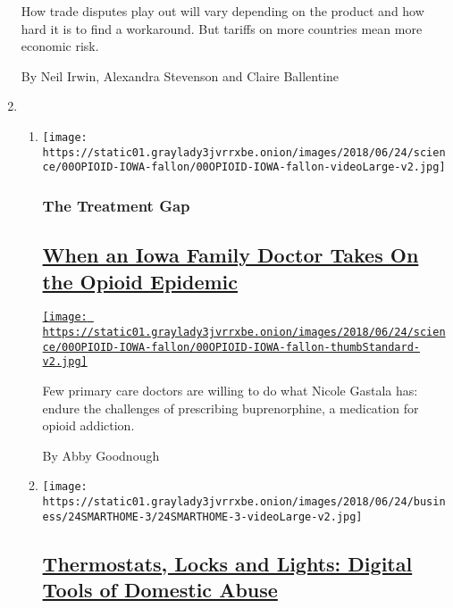 \begin{enumerate}
  How trade disputes play out will vary depending on the product and how
  hard it is to find a workaround. But tariffs on more countries mean
  more economic risk.

  By Neil Irwin, Alexandra Stevenson and Claire Ballentine
\item
  \begin{enumerate}
  \def\labelenumii{\arabic{enumii}.}
  \item
    \texttt{[image: https://static01.graylady3jvrrxbe.onion/images/2018/06/24/science/00OPIOID-IOWA-fallon/00OPIOID-IOWA-fallon-videoLarge-v2.jpg]}

    \hypertarget{the-treatment-gap}{%
    \subsubsection{The Treatment Gap}\label{the-treatment-gap}}

    \hypertarget{when-an-iowa-family-doctor-takes-on-the-opioid-epidemic}{%
    \subsection{\texorpdfstring{\href{/2018/06/23/health/opioid-addiction-suboxone-treatment.html}{When
    an Iowa Family Doctor Takes On the Opioid
    Epidemic}}{When an Iowa Family Doctor Takes On the Opioid Epidemic}}\label{when-an-iowa-family-doctor-takes-on-the-opioid-epidemic}}

    \href{/2018/06/23/health/opioid-addiction-suboxone-treatment.html}{\texttt{[image: https://static01.graylady3jvrrxbe.onion/images/2018/06/24/science/00OPIOID-IOWA-fallon/00OPIOID-IOWA-fallon-thumbStandard-v2.jpg]}}

    Few primary care doctors are willing to do what Nicole Gastala has:
    endure the challenges of prescribing buprenorphine, a medication for
    opioid addiction.

    By Abby Goodnough
  \item
    \texttt{[image: https://static01.graylady3jvrrxbe.onion/images/2018/06/24/business/24SMARTHOME-3/24SMARTHOME-3-videoLarge-v2.jpg]}

    \hypertarget{thermostats-locks-and-lights-digital-tools-of-domestic-abuse}{%
    \subsection{\texorpdfstring{\href{/2018/06/23/technology/smart-home-devices-domestic-abuse.html}{Thermostats,
    Locks and Lights: Digital Tools of Domestic
    Abuse}}{Thermostats, Locks and Lights: Digital Tools of Domestic Abuse}}\label{thermostats-locks-and-lights-digital-tools-of-domestic-abuse}}


\end{enumerate}
\end{enumerate}
